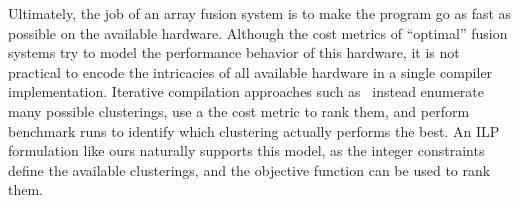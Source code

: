 Ultimately, the job of an array fusion system is to make the program go as fast as possible on the available hardware. Although the cost metrics of ``optimal'' fusion systems try to model the performance behavior of this hardware, it is not practical to encode the intricacies of all available hardware in a single compiler implementation. Iterative compilation approaches such as~\cite{ashby2006iterative} instead enumerate many possible clusterings, use a the cost metric to rank them, and perform benchmark runs to identify which clustering actually performs the best. An ILP formulation like ours naturally supports this model, as the integer constraints define the available clusterings, and the objective function can be used to rank them.



% 
% 


